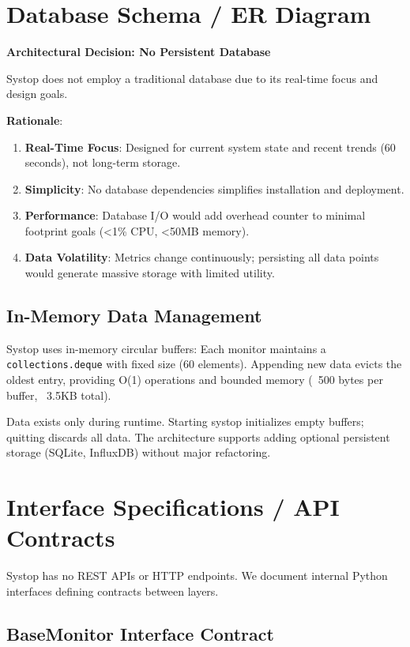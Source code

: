 \documentclass[12pt,a4paper,oneside]{report}
\begin{document}
\section{Database Schema / ER Diagram}
\label{sec:database-schema}

\textbf{Architectural Decision: No Persistent Database}

Systop does not employ a traditional database due to its real-time focus and design goals.

\textbf{Rationale}:
\begin{enumerate}
    \item \textbf{Real-Time Focus}: Designed for current system state and recent trends (60 seconds), not long-term storage.
    \item \textbf{Simplicity}: No database dependencies simplifies installation and deployment.
    \item \textbf{Performance}: Database I/O would add overhead counter to minimal footprint goals (<1\% CPU, <50MB memory).
    \item \textbf{Data Volatility}: Metrics change continuously; persisting all data points would generate massive storage with limited utility.
\end{enumerate}

\subsection{In-Memory Data Management}

Systop uses in-memory circular buffers: Each monitor maintains a \texttt{collections.deque} with fixed size (60 elements). Appending new data evicts the oldest entry, providing O(1) operations and bounded memory (~500 bytes per buffer, ~3.5KB total).

Data exists only during runtime. Starting systop initializes empty buffers; quitting discards all data. The architecture supports adding optional persistent storage (SQLite, InfluxDB) without major refactoring.

\section{Interface Specifications / API Contracts}
\label{sec:interface-specifications}

Systop has no REST APIs or HTTP endpoints. We document internal Python interfaces defining contracts between layers.

\subsection{BaseMonitor Interface Contract}
\end{document}
